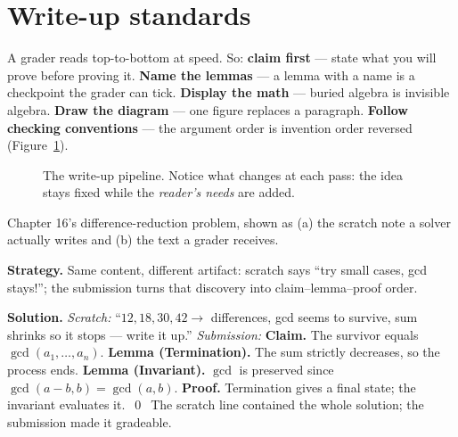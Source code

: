 \section{Write-up standards}
A grader reads top-to-bottom at speed. So: \textbf{claim first} ---
state what you will prove before proving it. \textbf{Name the lemmas}
--- a lemma with a name is a checkpoint the grader can tick.
\textbf{Display the math} --- buried algebra is invisible algebra.
\textbf{Draw the diagram} --- one figure replaces a paragraph.
\textbf{Follow checking conventions} --- the argument order is
invention order reversed (Figure~\ref{fig:pipeline}).
\begin{figure}[ht]\centering

\caption{The write-up pipeline. Notice what changes at each pass: the
idea stays fixed while the \emph{reader's needs} are added.}
\label{fig:pipeline}
\end{figure}
\begin{example}
Chapter 16's difference-reduction problem, shown as (a) the scratch
note a solver actually writes and (b) the text a grader receives.

\textbf{Strategy.} Same content, different artifact: scratch says
``try small cases, gcd stays!''; the submission turns that discovery
into claim--lemma--proof order.

\textbf{Solution.} \emph{Scratch:} ``$12,18,30,42\to$ differences,
gcd seems to survive, sum shrinks so it stops --- write it up.''
\emph{Submission:} \textbf{Claim.} The survivor equals
$\gcd(a_1,\dots,a_n)$. \textbf{Lemma (Termination).} The sum strictly
decreases, so the process ends. \textbf{Lemma (Invariant).}
$\gcd$ is preserved since $\gcd(a-b,b)=\gcd(a,b)$. \textbf{Proof.}
Termination gives a final state; the invariant evaluates it.\ \qed\
The scratch line contained the whole solution; the submission made it
gradeable.
\end{example}

